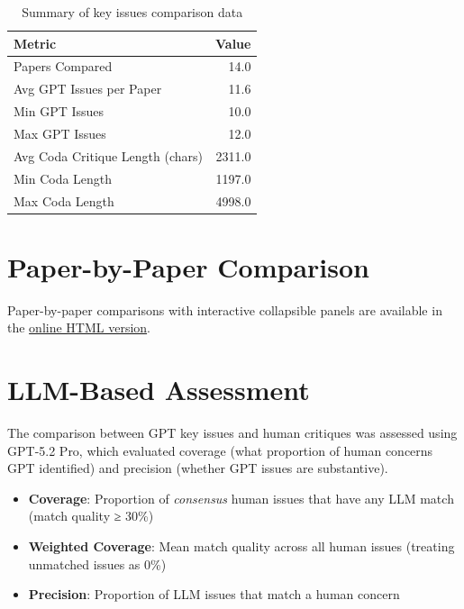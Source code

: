 \documentclass[
  11pt,
  letterpaper,
  DIV=11,
  numbers=noendperiod]{scrreprt}
\providecommand{\tightlist}{%
  \setlength{\itemsep}{0pt}\setlength{\parskip}{0pt}}
\begin{document}
\begin{longtable}[]{@{}lr@{}}

\caption{\label{tbl-overview-stats}Summary of key issues comparison
data}

\tabularnewline

\toprule\noalign{}
Metric & Value \\
\midrule\noalign{}
\endhead
\bottomrule\noalign{}
\endlastfoot
Papers Compared & 14.0 \\
Avg GPT Issues per Paper & 11.6 \\
Min GPT Issues & 10.0 \\
Max GPT Issues & 12.0 \\
Avg Coda Critique Length (chars) & 2311.0 \\
Min Coda Length & 1197.0 \\
Max Coda Length & 4998.0 \\

\end{longtable}

\section{Paper-by-Paper Comparison}\label{sec-paper-comparison}

Paper-by-paper comparisons with interactive collapsible panels are
available in the
\href{https://llm-uj-research-eval.netlify.app/results_critiques.html\#sec-paper-comparison}{online
HTML version}.

\section{LLM-Based Assessment}\label{sec-llm-assessment}

The comparison between GPT key issues and human critiques was assessed
using GPT-5.2 Pro, which evaluated coverage (what proportion of human
concerns GPT identified) and precision (whether GPT issues are
substantive).

\begin{itemize}
\tightlist
\item
  \textbf{Coverage}: Proportion of \emph{consensus} human issues that
  have any LLM match (match quality ≥ 30\%)
\item
  \textbf{Weighted Coverage}: Mean match quality across all human issues
  (treating unmatched issues as 0\%)
\item
  \textbf{Precision}: Proportion of LLM issues that match a human
  concern
\end{itemize}
\end{document}
